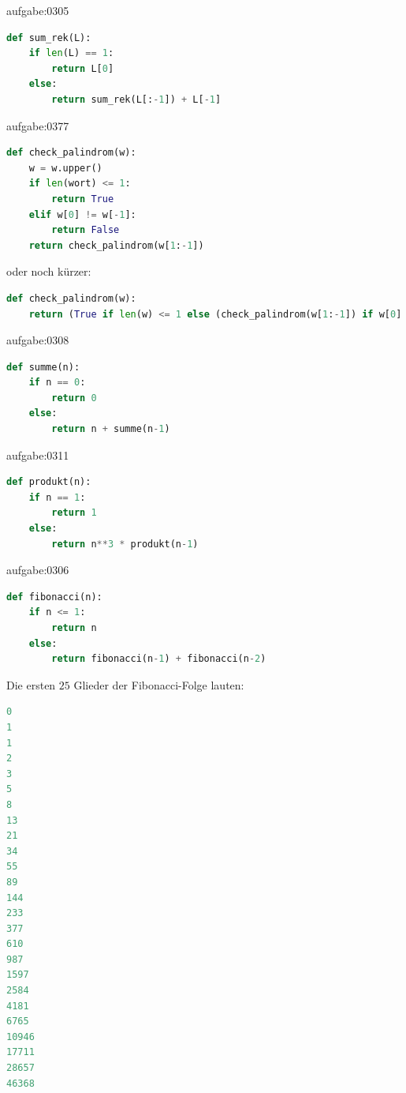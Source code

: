 \begin{antwort}{aufgabe:0305}
\begin{lstlisting}[language=Python]
def sum_rek(L):
    if len(L) == 1:
        return L[0]
    else:
        return sum_rek(L[:-1]) + L[-1]
\end{lstlisting}
\end{antwort}


\begin{antwort}{aufgabe:0377}
\begin{lstlisting}[language=Python]
def check_palindrom(w):
    w = w.upper()
    if len(wort) <= 1:
        return True
    elif w[0] != w[-1]:
        return False
    return check_palindrom(w[1:-1])
\end{lstlisting}
oder noch kürzer:
\begin{lstlisting}[language=Python]
def check_palindrom(w):
    return (True if len(w) <= 1 else (check_palindrom(w[1:-1]) if w[0].lower() == w[-1].lower() else False))
\end{lstlisting}
\end{antwort}


\begin{antwort}{aufgabe:0308}
\begin{lstlisting}[language=Python,caption=rekursive Berechnung einer Summe]
def summe(n):
    if n == 0:
        return 0
    else:
        return n + summe(n-1)
\end{lstlisting}
\end{antwort}


\begin{antwort}{aufgabe:0311}
\begin{lstlisting}[language=Python,caption=rekursive Berechnung eines Produkts]
def produkt(n):
    if n == 1:
        return 1
    else:
        return n**3 * produkt(n-1)
\end{lstlisting}
\end{antwort}


\begin{antwort}{aufgabe:0306}
\begin{lstlisting}[language=Python,caption=rekursive Berechnung der Fibonacci-Folge]
def fibonacci(n):
    if n <= 1:
        return n
    else:
        return fibonacci(n-1) + fibonacci(n-2)
\end{lstlisting}
\noindent
Die ersten $25$ Glieder der Fibonacci-Folge lauten:
\begin{lstlisting}[language=Python,caption=die ersten 25 Glieder der Fibonacci-Folge]
0
1
1
2
3
5
8
13
21
34
55
89
144
233
377
610
987
1597
2584
4181
6765
10946
17711
28657
46368
\end{lstlisting}
\end{antwort}


